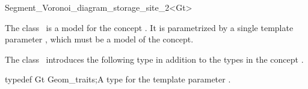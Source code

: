 



\begin{ccRefClass}{Segment_Voronoi_diagram_storage_site_2<Gt>}


\ccDefinition
  
The class \ccRefName\ is a model for the concept
. It is parametrized by a single
template parameter , which must be a model of the
 concept.


\ccIsModel
{}

\ccTypes

The class \ccRefName\ introduces the following type in addition to the
types in the concept .

\ccTypedef
{typedef Gt Geom_traits;}{A type for the template parameter .}




\end{ccRefClass}
